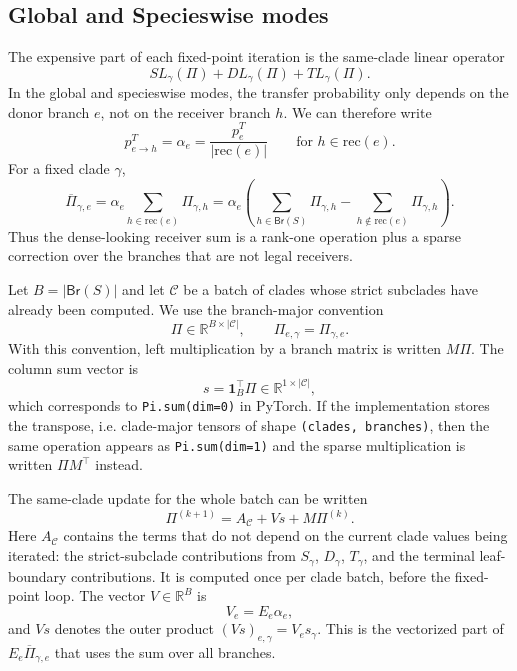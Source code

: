 \documentclass{article}
\newcommand{\1}{\mathbf{1}}
\newcommand{\Rbb}{\mathbb{R}}
\newcommand{\Pibar}{\overline{\Pi}}
\newcommand{\rec}{\mathrm{rec}}
\begin{document}
\subsection{Global and Specieswise modes}
The expensive part of each fixed-point iteration is the same-clade linear operator
\[
    SL_\gamma(\Pi)+DL_\gamma(\Pi)+TL_\gamma(\Pi).
\]
In the global and specieswise modes, the transfer probability only depends on the donor branch $e$, not on the receiver branch $h$. We can therefore write
\[
    p^T_{e\to h}=\alpha_e=\frac{p^T_e}{|\rec(e)|}
    \qquad\text{for }h\in\rec(e).
\]
For a fixed clade $\gamma$,
\[
    \Pibar_{\gamma,e}
    =
    \alpha_e\sum_{h\in\rec(e)}\Pi_{\gamma,h}
    =
    \alpha_e\left(\sum_{h\in\mathsf{Br}(S)}\Pi_{\gamma,h}
    -
    \sum_{h\notin\rec(e)}\Pi_{\gamma,h}\right).
\]
Thus the dense-looking receiver sum is a rank-one operation plus a sparse correction over the branches that are not legal receivers.

Let $B=|\mathsf{Br}(S)|$ and let $\mathcal{C}$ be a batch of clades whose strict subclades have already been computed. We use the branch-major convention
\[
    \Pi\in\Rbb^{B\times |\mathcal{C}|},
    \qquad
    \Pi_{e,\gamma}=\Pi_{\gamma,e}.
\]
With this convention, left multiplication by a branch matrix is written $M\Pi$. The column sum vector is
\[
    s=\mathbf{1}_B^\top\Pi\in\Rbb^{1\times |\mathcal{C}|},
\]
which corresponds to \texttt{Pi.sum(dim=0)} in PyTorch. If the implementation stores the transpose, i.e. clade-major tensors of shape \texttt{(clades, branches)}, then the same operation appears as \texttt{Pi.sum(dim=1)} and the sparse multiplication is written $\Pi M^\top$ instead.

The same-clade update for the whole batch can be written
\begin{equation}
    \label{eq:uniform-transfer-spmm}
    \Pi^{(k+1)}
    =
    A_{\mathcal{C}}
    +
    V s
    +
    M\Pi^{(k)}.
\end{equation}
Here $A_{\mathcal{C}}$ contains the terms that do not depend on the current clade values being iterated: the strict-subclade contributions from $S_\gamma$, $D_\gamma$, $T_\gamma$, and the terminal leaf-boundary contributions. It is computed once per clade batch, before the fixed-point loop. The vector $V\in\Rbb^B$ is
\[
    V_e=E_e\alpha_e,
\]
and $Vs$ denotes the outer product $(Vs)_{e,\gamma}=V_e s_\gamma$. This is the vectorized part of $E_e\Pibar_{\gamma,e}$ that uses the sum over all branches.
\end{document}
